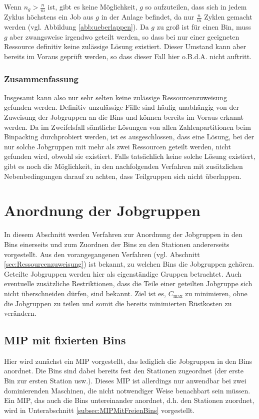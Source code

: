 \documentclass{scrreprt}
\begin{document}
Wenn $n_g > \frac{n}{m}$ ist,
gibt es keine Möglichkeit, $g$ so aufzuteilen, 
dass sich in jedem Zyklus höchstens ein Job aus $g$ in der Anlage befindet,
da nur $\frac{n}{m}$ Zyklen gemacht werden (vgl. Abbildung \ref{abb:ueberlappen}).
Da $g$ zu groß ist für einen Bin, muss $g$ aber zwangsweise irgendwo geteilt werden, so dass bei nur einer geeigneten Ressource definitiv keine zulässige Lösung existiert.
Dieser Umstand kann aber bereits im Voraus geprüft werden, so dass dieser Fall hier o.B.d.A. nicht auftritt.

\subsubsection{Zusammenfassung}
Insgesamt kann also nur sehr selten keine zulässige Ressourcenzuweisung gefunden werden.
Definitiv unzulässige Fälle sind häufig unabhängig von der Zuweisung der Jobgruppen an die Bins und können bereits im Voraus erkannt werden.
Da im Zweifelsfall sämtliche Lösungen von allen Zahlenpartitionen beim Binpacking durchprobiert werden, ist es ausgeschlossen, dass eine Lösung,
bei der nur solche Jobgruppen mit mehr als zwei Ressourcen geteilt werden, nicht gefunden wird, obwohl sie existiert.
Falls tatsächlich keine solche Lösung existiert, gibt es noch die Möglichkeit, in den nachfolgenden Verfahren mit zusätzlichen Nebenbedingungen darauf zu achten,
dass Teilgruppen sich nicht überlappen.


\section{Anordnung der Jobgruppen}
\label{sec:AnordnungDerJobgruppen}
In diesem Abschnitt werden Verfahren zur Anordnung der Jobgruppen in den Bins einerseits und
zum Zuordnen der Bins zu den Stationen andererseits vorgestellt.
Aus den vorangegangenen Verfahren (vgl. Abschnitt \ref{sec:Ressourcenzuweisung}) ist bekannt, zu welchen Bins die Jobgruppen gehören.
Geteilte Jobgruppen werden hier als eigenständige Gruppen betrachtet.
Auch eventuelle zusätzliche Restriktionen, dass die Teile einer geteilten Jobgruppe sich nicht überschneiden dürfen, sind bekannt.
Ziel ist es, $C_{\max}$ zu minimieren, ohne die Jobgruppen zu teilen und somit die bereits minimierten Rüstkosten zu verändern.


\subsection{MIP mit fixierten Bins}
\label{subsec:MIPMitFixiertenBins}
Hier wird zunächst ein MIP vorgestellt, das lediglich die Jobgruppen in den Bins anordnet.
Die Bins sind dabei bereits fest den Stationen zugeordnet (der erste Bin zur ersten Station usw.).
Dieses MIP ist allerdings nur anwendbar bei zwei dominierenden Maschinen, die nicht notwendiger Weise benachbart sein müssen.
Ein MIP, das auch die Bins untereinander anordnet, d.h. den Stationen zuordnet, wird in Unterabschnitt \ref{subsec:MIPMitFreienBins} vorgestellt.
\end{document}
